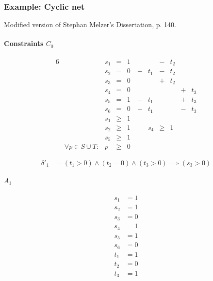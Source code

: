 \documentclass{article}
\begin{document}
\subsubsection{Example: Cyclic net}

Modified version of Stephan Melzer's Dissertation, p. 140.

\begin{dot2tex}[dot,options=-tmath]

\end{dot2tex}

\paragraph{Constraints $C_0$}

\begin{alignat*}{6}
&& s_1 &{}={}&   1 &     &     &{}-{}& t_2 &     &     \\
&& s_2 &{}={}&   0 &{}+{}& t_1 &{}-{}& t_2 &     &     \\
&& s_3 &{}={}&   0 &     &     &{}+{}& t_2 &     &     \\
&& s_4 &{}={}&   0 &     &     &     &     &{}+{}& t_3 \\
&& s_5 &{}={}&   1 &{}-{}& t_1 &     &     &{}+{}& t_3 \\
&& s_6 &{}={}&   0 &{}+{}& t_1 &     &     &{}-{}& t_3 \\
&& s_1 &{}\ge{}& 1 \\
&& s_2 &{}\ge{}& 1 \
&& s_4 &{}\ge{}& 1 \\
&& s_5 &{}\ge{}& 1 \\
&\forall p \in S \cup T:& p &{}\ge{}& 0
\end{alignat*}

\begin{align*}
  \delta'_1 &= (t_1 > 0) \land (t_2 = 0) \land (t_3 > 0) \implies (s_3 > 0)
\end{align*}

\paragraph{$A_1$}
\begin{align*}
  s_1 &= 1 \\
  s_2 &= 1 \\
  s_3 &= 0 \\
  s_4 &= 1 \\
  s_5 &= 1 \\
  s_6 &= 0 \\
  t_1 &= 1 \\
  t_2 &= 0 \\
  t_3 &= 1
\end{align*}
\end{document}
